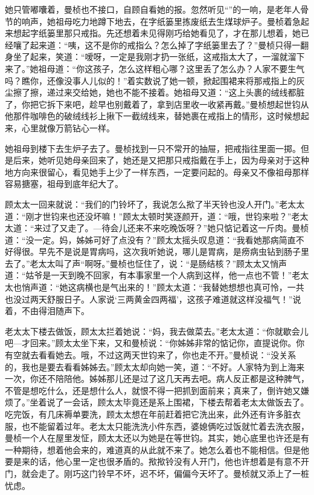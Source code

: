 \par 她只管嘟囔着，曼桢也不接口，自顾自看她的报。忽然听见“”的一响，是老年人骨节的响声，她祖母吃力地蹲下地去，在字纸篓里拣废纸去生煤球炉子。曼桢着急起来想起字纸篓里那只戒指。先还想着未见得刚巧给她看见了，才在那儿想着，她已经嚷了起来道：“咦，这不是你的戒指么？怎么掉了字纸篓里去了？”曼桢只得一翻身坐了起来，笑道：“嗳呀，一定是我刚才扔一张纸，这戒指太大了，一溜就溜下来了。”她祖母道：“你这孩子，怎么这样粗心哪？这里丢了怎么办？人家不要生气吗？瞧你，还像没事人儿似的！”着实数说了她一顿，掀起围裙来将那戒指上的灰尘擦了擦，递过来交给她，她也不能不接着。她祖母又道：“这上头裹的绒线都脏了，你把它拆下来吧，趁早也别戴着了，拿到店里收一收紧再戴。”曼桢想起世钧从他那件咖啡色的破绒线衫上揪下一截绒线来，替她裹在戒指上的情形，这时候想起来，心里就像万箭钻心一样。
\par 她祖母到楼下去生炉子去了。曼桢找到一只不常开的抽屉，把戒指往里面一掷。但是后来，她听见她母亲回来了，她还是又把那只戒指戴在手上，因为母亲对于这种地方向来很留心，看见她手上少了一样东西，一定要问起的。母亲又不像祖母那样容易搪塞，祖母到底年纪大了。
\par 顾太太一回来就说：“我们的门铃坏了，我说怎么揿了半天铃也没人开门。”老太太道：“刚才世钧来也还没坏嘛！”顾太太顿时笑逐颜开，道：“哦，世钧来啦？”老太太道：“来过了又走了。—待会儿还来不来吃晚饭呀？”她只惦记着这一斤肉。曼桢道：“没一定。妈，姊姊可好了点没有？”顾太太摇头叹息道：“我看她那病简直不好得很。早先不是说是胃病吗，这次我听她说，哪儿是胃病，是痨病虫钻到肠子里去了。”老太太叫了声“啊呀。”曼桢也怔住了，说：“是肠结核？”顾太太又悄声道：“姑爷是一天到晚不回家，有本事家里一个人病到这样，他一点也不管！”老太太也悄声道：“她这病横也是气出来的！”顾太太道：“我替她想想也真可怜，一共也没过两天舒服日子。人家说‘三两黄金四两福’，这孩子难道就这样没福气！”说着，不由得泪随声下。
\par 老太太下楼去做饭，顾太太拦着她说：“妈，我去做菜去。”老太太道：“你就歇会儿吧—才回来。”顾太太坐下来，又和曼桢说：“你姊姊非常的惦记你，直提说你。你有空就去看看她去。哦，不过这两天世钧来了，你也走不开。”曼桢说：“没关系的，我也是要去看看姊姊去。”顾太太却向她一笑，道：“不好。人家特为到上海来一次，你还不陪陪他。姊姊那儿还是过了这几天再去吧。病人反正都是这种脾气，不管是想吃什么，还是想什么人，就恨不得一把抓到面前来；真来了，倒许她又嫌烦了。”坐着说了一会话，顾太太毕竟还是系上围裙，下楼去帮着老太太做饭去了。吃完饭，有几床褥单要洗，顾太太想在年前赶着把它洗出来，此外还有许多脏衣服，也不能留着过年。老太太只能洗洗小件东西，婆媳俩吃过饭就忙着去洗衣服，曼桢一个人在屋里发怔，顾太太还以为她是在等世钧。其实，她心底里也许还是有一种期待，想着他会来的，难道真的从此就不来了。她怎么着也不能相信。但是他要是来的话，他心里一定也很矛盾的。揿揿铃没有人开门，他也许想着是有意不开门，就会走了。刚巧这门铃早不坏，迟不坏，偏偏今天坏了。曼桢就又添上了一桩忧虑。
